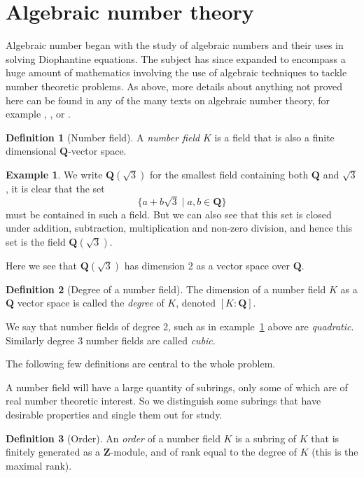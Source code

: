 \documentclass[12pt,a4paper,abstracton,bibtotoc]{scrreprt}
\theoremstyle{definition}
\newtheorem{defn}{Definition}
\newtheorem{ex}{Example}
\newcommand{\QQ}{\mathbf{Q}}
\newcommand{\ZZ}{\mathbf{Z}}
\begin{document}
\section{Algebraic number theory}
\label{sec:ant}

Algebraic number began with the study of algebraic numbers and their uses in solving Diophantine equations.
The subject has since expanded to encompass a huge amount of mathematics involving the use of algebraic techniques to tackle number theoretic problems. %
As above, more details about anything not proved here can be found in any of the many texts on algebraic number theory, for example \cite{neukirch}, \cite{lang}, \cite{narkiewicz} or \cite{stewtall}.

\begin{defn}[Number field]
A \emph{number field} $K$ is a field that is also a finite dimensional $\QQ$-vector space.
\end{defn}

\begin{ex}\label{ex:quad}
We write $\QQ(\sqrt{3})$ for the smallest field containing both $\QQ$ and $\sqrt{3}$, it is clear that the set
\[
\{a + b\sqrt{3}\mid a,b \in \QQ\}
\]
must be contained in such a field.
But we can also see that this set is closed under addition, subtraction, multiplication and non-zero division, and hence this set is the field $\QQ(\sqrt{3})$.

Here we see that $\QQ(\sqrt{3})$ has dimension 2 as a vector space over $\QQ$.
\end{ex}

\begin{defn}[Degree of a number field]
The dimension of a number field $K$ as a $\QQ$ vector space is called the \emph{degree} of $K$, denoted $[K:\QQ]$.

We say that number fields of degree 2, such as in example~\ref{ex:quad} above are \emph{quadratic}.
Similarly degree 3 number fields are called \emph{cubic}.
\end{defn}

\minisec{}
The following few definitions are central to the whole problem.

A number field will have a large quantity of subrings, only some of which are of real number theoretic interest.
So we distinguish some subrings that have desirable properties and single them out for study.

\begin{defn}[Order]
An \emph{order} of a number field $K$ is a subring of $K$ that is finitely generated as a $\ZZ$-module, and of rank equal to the degree of $K$ (this is the maximal rank).
\end{defn}
\end{document}

